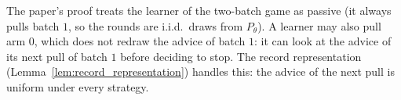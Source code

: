 \begin{remark}
  The paper's proof treats the learner of the two-batch game as passive (it always pulls batch $1$,
  so the rounds are i.i.d.\ draws from $P_\theta$). A learner may also pull arm $0$, which does not
  redraw the advice of batch $1$: it can look at the advice of its next pull of batch $1$ before
  deciding to stop. The record representation (Lemma~\ref{lem:record_representation}) handles
  this: the advice of the next pull is uniform under every strategy.
\end{remark}

